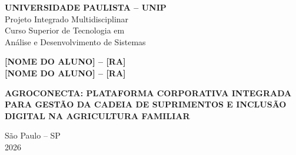 
\begin{titlepage}
  \begin{center}
    \fontsize{12}{18}\selectfont
    \textbf{UNIVERSIDADE PAULISTA -- UNIP}\\[0.2\baselineskip]
    Projeto Integrado Multidisciplinar\\[0.2\baselineskip]
    Curso Superior de Tecnologia em\\ Análise e Desenvolvimento de Sistemas

    \vspace{2.2cm}

    \textbf{[NOME DO ALUNO] -- [RA]}\\[0.25\baselineskip]
    \textbf{[NOME DO ALUNO] -- [RA]}

    \vspace{2.4cm}

    {\fontsize{14}{21}\selectfont\bfseries
      AGROCONECTA: PLATAFORMA CORPORATIVA INTEGRADA PARA GESTÃO DA CADEIA
      DE SUPRIMENTOS E INCLUSÃO DIGITAL NA AGRICULTURA FAMILIAR\par}

    \vfill

    São Paulo -- SP\\
    2026
  \end{center}
\end{titlepage}

